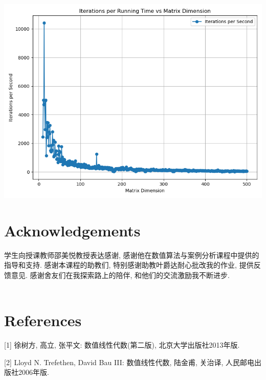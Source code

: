 \documentclass[12pt, a4paper]{ctexart}
\begin{document}
\begin{center}
    \includegraphics[scale=0.5]{iterations_per_time.png}
\end{center}


\section{Acknowledgements}

学生向授课教师邵美悦教授表达感谢, 感谢他在数值算法与案例分析课程中提供的指导和支持.
感谢本课程的助教们, 特别感谢助教叶爵达耐心批改我的作业, 提供反馈意见.
感谢舍友们在我探索路上的陪伴, 和他们的交流激励我不断进步.
\\
\\
\section{References}

[1] 徐树方, 高立, 张平文: 数值线性代数(第二版), 北京大学出版社2013年版.

[2] Lloyd N. Trefethen, David Bau III: 数值线性代数, 陆金甫, 关治译, 人民邮电出版社2006年版.
\end{document}
